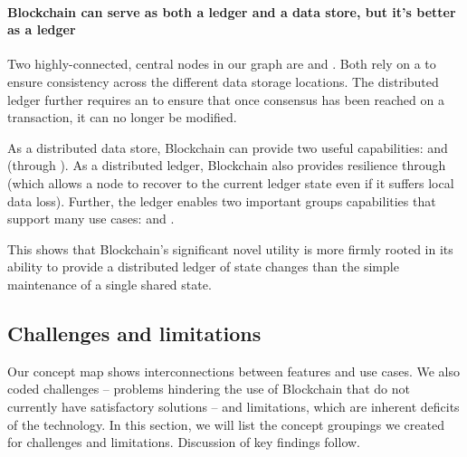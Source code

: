 {\paragraph{Blockchain can serve as both a ledger and a data store, but it's better as a ledger}
Two highly-connected, central nodes in our graph are  and . Both rely on a  to ensure consistency across the different data storage locations. The distributed ledger further requires an  to ensure that once consensus has been reached on a transaction, it can no longer be modified. 

As a distributed data store, Blockchain can provide two useful capabilities:  and  (through ). As a distributed ledger, Blockchain also provides resilience through  (which allows a node to recover to the current ledger state even if it suffers local data loss). Further, the ledger enables two important groups capabilities that support many use cases:  and . 

This shows that Blockchain's significant novel utility is more firmly rooted in its ability to provide a distributed ledger of state changes than the simple maintenance of a single shared state.

\subsection{Challenges and limitations}
\label{subsec:challenges}
Our concept map shows interconnections between features and use cases. We also coded challenges -- problems hindering the use of Blockchain that do not currently have satisfactory solutions -- and limitations, which are inherent deficits of the technology. In this section, we will list the concept groupings we created for challenges and limitations. Discussion of key findings follow.

}
